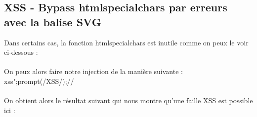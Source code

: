 \documentclass{article}
\begin{document}
\subsection{XSS - Bypass htmlspecialchars par erreurs avec la balise SVG}
Dans certains cas, la fonction htmlspecialchars est inutile comme on peux le voir ci-dessous :
\vspace{0.2cm}\\
\vspace{0.2cm}\\
On peux alors faire notre injection de la manière suivante : xss";prompt(/XSS/);//
\vspace{0.2cm}\\
\vspace{0.2cm}\\
On obtient alors le résultat suivant qui nous montre qu'une faille XSS est possible ici :
\vspace{0.2cm}\\
\end{document}
